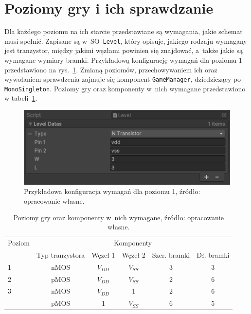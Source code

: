 \section{Poziomy gry i ich sprawdzanie}
\label{sec:sprawdzanie_poprawnosci_schematu}

Dla każdego poziomu na ich starcie przedstawiane są wymagania, jakie schemat musi spełnić.
Zapisane są w~SO~\texttt{Level}, który opisuje,
jakiego rodzaju wymagany jest tranzystor,
między jakimi węzłami powinien się znajdować,
a~także jakie są wymagane wymiary bramki.
Przykładową konfigurację wymagań dla poziomu 1 przedstawiono na rys.~\ref{fig:level1_requirements}.
Zmianą poziomów, przechowywaniem ich oraz wywołaniem sprawdzenia zajmuje się komponent \texttt{GameManager},
dziedziczący po \texttt{MonoSingleton}.
Poziomy gry oraz komponenty w~nich wymagane przedstawiono w tabeli~\ref{tab:level_components}.

\begin{figure}[h]
    \centering
    \includegraphics[width=.9\textwidth]{chapters/chapter4/rys/level}
    \caption[Przykładowe wymagania dla poziomu 1.]
    {Przykładowa konfiguracja wymagań dla poziomu 1, źródło: opracowanie własne.}
    \label{fig:level1_requirements}
\end{figure}

\begin{table}
    \centering
    \caption[Poziomy gry oraz komponenty w~nich wymagane.]
    {Poziomy gry oraz komponenty w~nich wymagane, źródło: opracowanie własne.}
    \label{tab:level_components}
    \begin{tabular}{|l|c|c|c|c|c|}
        \hline
        Poziom & \multicolumn{5}{|c|}{Komponenty} \\
        \cline{2-6}
        & Typ tranzystora & Węzeł 1 & Węzeł 2 & Szer. bramki & Dł. bramki \\
        \hline
        \hline
        1 & nMOS & $V_{DD}$ & $V_{SS}$ & 3 & 3 \\
        \hline
        2 & pMOS & $V_{DD}$ & $V_{SS}$ & 2 & 6 \\
        \hline
        3 & nMOS & $V_{DD}$ & 1 & 2 & 6 \\
        \cline{2-6}
        & pMOS & 1 & $V_{SS}$ & 6 & 5 \\
        \hline
    \end{tabular}
\end{table}

